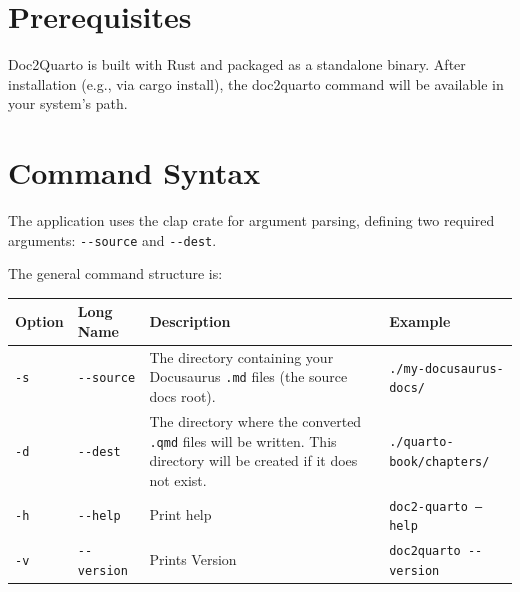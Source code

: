 \documentclass[
  letterpaper,
  DIV=11,
  numbers=noendperiod]{scrreprt}
\newenvironment{Shaded}{\begin{snugshade}}{\end{snugshade}}
\newcommand{\ExtensionTok}[1]{\textcolor[rgb]{0.00,0.23,0.31}{#1}}
\newcommand{\NormalTok}[1]{\textcolor[rgb]{0.00,0.23,0.31}{#1}}
\newcommand{\OperatorTok}[1]{\textcolor[rgb]{0.37,0.37,0.37}{#1}}
\begin{document}
\chapter{Prerequisites}\label{prerequisites-1}

Doc2Quarto is built with Rust and packaged as a standalone binary. After
installation (e.g., via cargo install), the doc2quarto command will be
available in your system's path.

\chapter{Command Syntax}\label{command-syntax}

The application uses the clap crate for argument parsing, defining two
required arguments: \texttt{-\/-source} and \texttt{-\/-dest}.

The general command structure is:

\begin{Shaded}
\end{Shaded}

\begin{longtable}[]{@{}
  >{\raggedright\arraybackslash}p{}
  >{\raggedright\arraybackslash}p{}
  >{\raggedright\arraybackslash}p{}
  >{\raggedright\arraybackslash}p{}@{}}
\toprule\noalign{}
\begin{minipage}[b]{\linewidth}\raggedright
Option
\end{minipage} & \begin{minipage}[b]{\linewidth}\raggedright
Long Name
\end{minipage} & \begin{minipage}[b]{\linewidth}\raggedright
Description
\end{minipage} & \begin{minipage}[b]{\linewidth}\raggedright
Example
\end{minipage} \\
\midrule\noalign{}
\endhead
\bottomrule\noalign{}
\endlastfoot
\texttt{-s} & \texttt{-\/-source} & The directory containing your
Docusaurus \texttt{.md} files (the source docs root). &
\texttt{./my-docusaurus-docs/} \\
\texttt{-d} & \texttt{-\/-dest} & The directory where the converted
\texttt{.qmd} files will be written. This directory will be created if
it does not exist. & \texttt{./quarto-book/chapters/} \\
\texttt{-h} & \texttt{-\/-help} & Print help &
\texttt{doc2-quarto\ —help} \\
\texttt{-v} & \texttt{-\/-version} & Prints Version &
\texttt{doc2quarto\ -\/-version} \\
\end{longtable}
\end{document}
